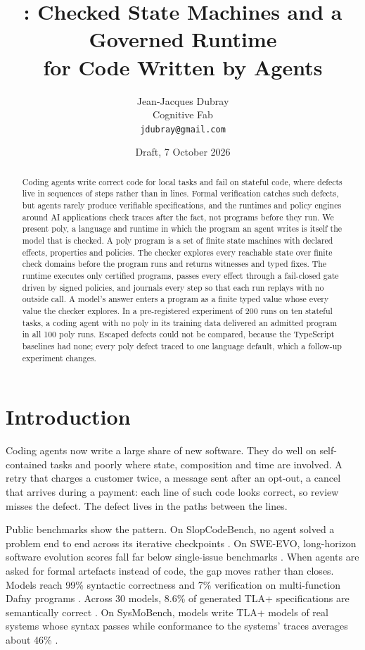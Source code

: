 \documentclass[11pt]{article}
\title{\poly: Checked State Machines and a Governed Runtime\\for Code Written by Agents}
\author{Jean-Jacques Dubray\\ Cognitive Fab\\ \texttt{jdubray@gmail.com}}
\date{Draft, 7 October 2026}
\newcommand{\poly}{\textsf{poly}}
\begin{document}
\maketitle

\begin{abstract}
Coding agents write correct code for local tasks and fail on stateful code, where defects live in sequences of steps rather than in lines. Formal verification catches such defects, but agents rarely produce verifiable specifications, and the runtimes and policy engines around AI applications check traces after the fact, not programs before they run. We present \poly, a language and runtime in which the program an agent writes is itself the model that is checked. A \poly{} program is a set of finite state machines with declared effects, properties and policies. The checker explores every reachable state over finite check domains before the program runs and returns witnesses and typed fixes. The runtime executes only certified programs, passes every effect through a fail-closed gate driven by signed policies, and journals every step so that each run replays with no outside call. A model's answer enters a program as a finite typed value whose every value the checker explores. In a pre-registered experiment of 200 runs on ten stateful tasks, a coding agent with no \poly{} in its training data delivered an admitted program in all 100 \poly{} runs. Escaped defects could not be compared, because the TypeScript baselines had none; every \poly{} defect traced to one language default, which a follow-up experiment changes.
\end{abstract}

\section{Introduction}
\label{sec:intro}

Coding agents now write a large share of new software. They do well on self-contained tasks and poorly where state, composition and time are involved. A retry that charges a customer twice, a message sent after an opt-out, a cancel that arrives during a payment: each line of such code looks correct, so review misses the defect. The defect lives in the paths between the lines.

Public benchmarks show the pattern. On SlopCodeBench, no agent solved a problem end to end across its iterative checkpoints \cite{orlanski2026slopcode}. On SWE-EVO, long-horizon software evolution scores fall far below single-issue benchmarks \cite{sweevo2026}. When agents are asked for formal artefacts instead of code, the gap moves rather than closes. Models reach 99\% syntactic correctness and 7\% verification on multi-function Dafny programs \cite{dafnycomp2026}. Across 30 models, 8.6\% of generated TLA+ specifications are semantically correct \cite{bisharat2026tla}. On SysMoBench, models write TLA+ models of real systems whose syntax passes while conformance to the systems' traces averages about 46\% \cite{sysmobench2026}.
\end{document}
